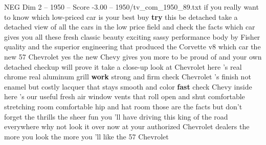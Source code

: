 \begin{textsample}{NEG Dim 2 – 1950 – Score -3.00 – 1950/tv\_com\_1950\_89.txt}  \label{ex:f2_neg_084}
if you really want to know which low-priced car is your best buy \textbf{try} this be detached take a detached view of all the cars in the low price field and check the facts which car gives you all these fresh classic beauty exciting sassy performance body by Fisher quality and the superior engineering that produced the Corvette v8 which car the new 57 Chevrolet yes the new Chevy gives you more to be proud of and your own detached checkup will prove it take a close-up look at Chevrolet here 's real chrome real aluminum grill \textbf{work} strong and firm check Chevrolet 's finish not enamel but costly lacquer that stays smooth and color \textbf{fast} check Chevy inside here 's our useful fresh air window vents that roll open and shut comfortable stretching room comfortable hip and hat room those are the facts but don't forget the thrills the sheer fun you 'll have driving this king of the road everywhere why not look it over now at your authorized Chevrolet dealers the more you look the more you 'll like the 57 Chevrolet

\end{textsample}
